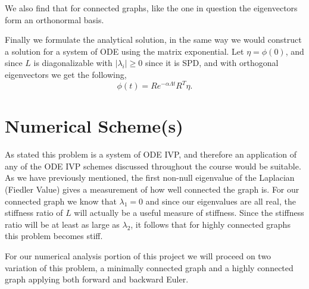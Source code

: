 \documentclass[11pt]{article}
\begin{document}
We also find that for connected graphs, like the one in question the eigenvectors form an 
orthonormal basis.\cite{Radu}




Finally we formulate the analytical solution, in the same way we would construct a solution for a system of ODE using the matrix exponential. Let 
$\eta = \phi(0)$, and since $L$ is diagonalizable with $|\lambda_i| \geq 0$ since it is SPD, and with orthogonal eigenvectors we get the following, 
\begin{equation*}
    \phi(t) = Re^{-\alpha \Lambda t}R^T\eta.
\end{equation*}











\section{Numerical Scheme(s)} 
As stated this problem is a system of ODE IVP, and therefore an application of any of the ODE IVP schemes discussed 
throughout the course would be suitable. As we have previously mentioned, the first non-null eigenvalue of the Laplacian (Fiedler Value)
gives a measurement of how well connected the graph is. For our connected graph we know that $\lambda_1 = 0$ and since our eigenvalues 
are all real, the stiffness ratio of $L$ will actually be a useful measure of stiffness. Since the stiffness ratio will be at least as large as
$\lambda_2$, it follows that for highly connected graphs this problem becomes stiff. 


For our numerical analysis portion of this project we will proceed on two variation of this problem, a minimally connected graph and a highly connected graph
applying both forward and backward Euler. 
\end{document}
